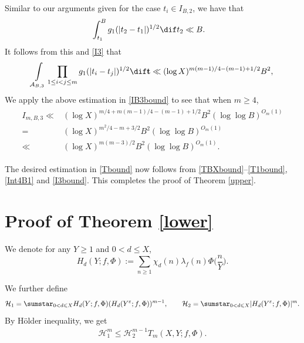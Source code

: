 \documentclass[twoside,leqno,10pt, A4]{amsart}
\begin{document}
   Similar to our arguments given for the case $t_i \in I_{B,2}$, we have that
\begin{align*}
\begin{split}
  & \int_{t_1}^{B} g_1(|t_2-t_1|)^{1/2}\dif t_2 \ll  B.
\end{split}
\end{align*}
  It follows from this and \eqref{I3} that
\begin{align*}
 \int\limits_{\mathcal{A}_{B,3}}\prod_{1\leq i<j\leq m} g_1(|t_i-t_j|)^{1/2}\dif \mathbf{t} \ll (\log X)^{m(m-1)/4-(m-1)+1/2}B^{2},
\end{align*}
   We apply the above estimation in \eqref{IB3bound} to see that when $m \geq 4$,
\begin{align}
\label{I3bound}
\begin{split}
I_{m,B,3} \ll & (\log X)^{m/4+m(m-1)/4-(m-1)+1/2} B^{2}(\log \log B)^{O_m(1)} \\
           =& (\log X)^{m^2/4-m+3/2} B^{2}(\log \log B)^{O_m(1)} \\
           \ll & (\log X)^{m(m-3)/2} B^{2}(\log \log B)^{O_m(1)}.
\end{split}
\end{align}

   The desired estimation in \eqref{Tbound} now follows from \eqref{TBXbound}--\eqref{T1bound}, \eqref{Int4B1} and \eqref{I3bound}. This completes
   the proof of Theorem \ref{upper}.


\section{Proof of Theorem \ref{lower}}

   We denote for any $Y\geq 1$ and $0<d\leq X$,
$$H_{d}(Y;f,\Phi):= \sum_{n \geq 1} \chi_{d}(n)\lambda_f(n)\Phi\Big(\frac{n}{Y}\Big).$$

   We further define
\begin{equation*}
\mathcal{H}_1= \sumstar_{0<d\leqslant X} H_{d}(Y;f,\Phi) (H_{d}(Y^{\varepsilon};f,\Phi))^{m-1}, \quad \quad
\mathcal{H}_2=\sumstar_{0<d\leqslant X}\vert H_{d}(Y^{\varepsilon};f,\Phi) \vert^m.
\end{equation*}
By H\"older inequality, we get
\begin{align}
\label{Holder}
 \mathcal{H}_1^{m} \leq
 \mathcal{H}_2^{m-1} T_m(X,Y;f,\Phi).
 \end{align}
\end{document}
